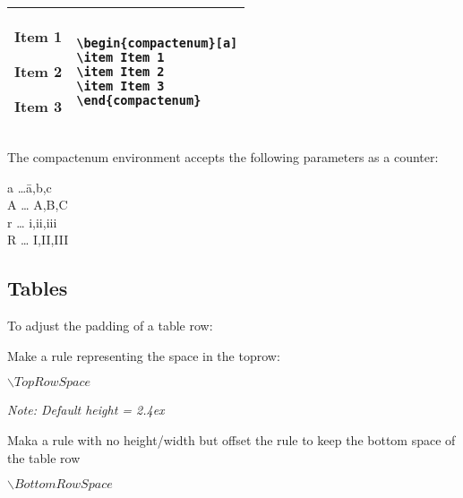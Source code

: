 \documentclass[a4paper,12pt]{article}
\begin{document}
\begin{longtable}{m{5cm} m{8cm}}
\begin{compactenum}[a]
\item Item 1
\item Item 2
\item Item 3
\end{compactenum}
&
\begin{verbatim}
\begin{compactenum}[a]
\item Item 1
\item Item 2
\item Item 3
\end{compactenum}
\end{verbatim}\\
\hline

\end{longtable}

The compactenum environment accepts the following parameters as a counter:

\begin{tabbing}
a \ldots \hspace{1em}\= a,b,c\\
A \ldots \> A,B,C\\
r \ldots \> i,ii,iii\\
R \ldots \> I,II,III\\
\end{tabbing}

\subsection{Tables}

To  adjust the padding of a table row:

Make a rule representing the space in the toprow:

$\backslash TopRowSpace$

\textit{Note: Default height = 2.4ex}

Maka a rule with no height/width but offset the rule to keep the bottom space of the table row 

$\backslash BottomRowSpace$
\end{document}
